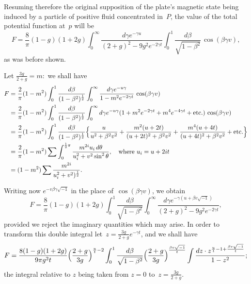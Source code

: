 \documentclass[12pt,notitlepage]{amsart}
\begin{document}
Resuming therefore the original supposition of the plate's magnetic state
being induced by a particle of positive fluid concentrated in~$P$, the value of
the total potential function at~$p$ will be
\[
F=\frac8\pi(1-g)(1+2g)
\int_0^\infty\frac{d\gamma e^{-\gamma u}}
{(2+g)^2-9g^2e^{-2\gamma t}}
\int_0^1\frac{d\beta}{\sqrt{1-\beta^2}}\,\cos(\beta\gamma v),
\]
as was before shown.

Let $\frac{3g}{2+g}=m:$  we shall have
\[
\begin{aligned}
F &= \frac2\pi(1-m^2)\int_0^1\frac{d\beta}{(1-\beta^2)^{\frac12}}
\int_0^\infty\frac{d\gamma e^{-u\gamma}}
{1-m^2e^{-2\gamma t}}\,\cos(\beta\gamma v)\\
&= \frac2\pi(1-m^2)\int_0^1\frac{d\beta}{(1-\beta^2)^{\frac12}}
\int_0^\infty d\gamma e^{-u\gamma}
(1+m^2e^{-2\gamma t}+m^4e^{-4\gamma t}+\text{etc.})\,\cos(\beta\gamma v)\\
&= \frac2\pi(1-m^2)\int_0^1\frac{d\beta}{(1-\beta^2)^{\frac12}}
\Bigl\{ \frac{u}{u^2+\beta^2v^2}+\frac{m^2(u+2t)}{(u+2t)^2+\beta^2v^2}
+\frac{m^4(u+4t)}{(u+4t)^2+\beta^2v^2}+\text{etc.} \Bigr\}\\
&= \frac2\pi(1-m^2)\sum\int_0^{\frac12\pi}
\frac{m^{2i}u_i\,d\theta}{u_i^2+v^2\sin^2\theta},
\quad\text{where $u_i=u+2it$}\\
&= (1-m^2)\sum\frac{m^{2i}}{u_i^2+v^2)^{\frac12}}.
\end{aligned}
\]

Writing now $e^{-v\beta\gamma\sqrt{-1}}$
in the place of~$\cos(\beta\gamma v)$, we obtain
\[
F=\frac8\pi(1-g)(1+2g)
\int_0^1\frac{d\beta}{\sqrt{1-\beta^2}}
\int_0^\infty\frac{d\gamma e^{-\gamma(u+\beta v\sqrt{-1})}}
{(2+g)^2-9g^2e^{-2\gamma t}},
\]
provided we reject the imaginary quantities which may arise. In order to
transform this double integral let~$z=\frac{3g}{2+g}e^{-\gamma t}$,
and we shall have
\[
F=\frac{8(1-g)(1+2g)}{9\pi g^2t}\Bigl(\frac{2+g}{3g}\Bigr)^{\frac ut-2}
\int_0^1\frac{d\beta}{\sqrt{1-\beta^2}}
\Bigl( \frac{2+g}{3g} \Bigr)^{\frac{\beta v\sqrt{-1}}{t}}
\int\frac{dz\cdot z^{\frac ut-1+\frac{\beta v\sqrt{-1}}{t}}}{1-z^2};
\]
the integral relative to $z$ being taken from $z=0$ to~$z=\frac{3g}{2+g}$.
\end{document}
